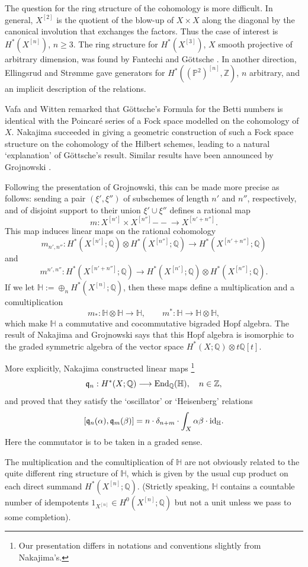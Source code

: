 \documentclass[twoside,11pt]{article}
\newcommand{\IH}{{\mathbb H}}
\newcommand{\IP}{{\mathbb P}}
\newcommand{\IQ}{{\mathbb Q}}
\newcommand{\IZ}{{\mathbb Z}}
\newcommand{\gothq}{{\mathfrak q}}
\newcommand{\tensor}{\otimes}
\newcommand{\End}{{\rm End}}
\newcommand{\qq}{\gothq}
\newcommand{\id}{{\rm id}}
\newcommand{\lra}{\longrightarrow}
\newcommand{\rationalmap}{{-{}-{}\!\to}}
\begin{document}
The question for the ring structure of the cohomology is more difficult. In general, $X^{[2]}$ is the quotient of the blow-up of $X\times X$ along the diagonal by the canonical involution that exchanges the factors. Thus the case
of interest is $H^*(X^{[n]})$, $n\geq3$. The ring structure for
$H^*(X^{[3]})$, $X$ smooth projective of arbitrary dimension, was found
by Fantechi and  G\"ottsche \cite{FantechiGoettsche}.
In another direction, Ellingsrud and Str\o{}mme \cite{EllStr2} gave generators 
for $H^*((\IP^2)^{[n]},\IZ)$, $n$ arbitrary, and an implicit description of the relations.

Vafa and  Witten \cite{VafaWitten} remarked that G\"ottsche's Formula for the 
Betti numbers is identical with the Poincar\'e series of a Fock space modelled 
on the cohomology of $X$. Nakajima \cite{Nakajima} succeeded in giving a 
geometric construction of such a Fock space structure on the cohomology of the 
Hilbert schemes, leading to a natural `explanation' of G\"ottsche's result. 
Similar results have been announced by Grojnowski \cite{Grojnowski}.

Following the presentation of  Grojnowski, this can be made more precise
as follows: sending a pair $(\xi',\xi'')$ of subschemes
of length $n'$ and $n''$, respectively, and of disjoint support to their
union $\xi'\cup\xi''$ defines a rational map 
$$m:X^{[n']}\times X^{[n'']}\rationalmap X^{[n'+n'']}.$$
This map induces linear maps on the rational cohomology
$$m_{n',n''}:H^*(X^{[n']};\IQ)\tensor H^*(X^{[n'']};\IQ)\lra H^*(X^{[n'+n'']};\IQ)$$
and
$$m^{n',n''}:H^*(X^{[n'+n'']};\IQ)\lra H^*(X^{[n']};\IQ)\tensor H^*(X^{[n'']};\IQ).$$
If we let $\IH:=\oplus_nH^*(X^{[n]};\IQ)$, then these maps define a multiplication
and a comultiplication
$$m_*:\IH\tensor\IH\lra \IH,\qquad m^*:\IH\lra \IH\tensor\IH,$$
which make $\IH$ a commutative and cocommutative bigraded Hopf algebra. The 
result of Nakajima and Grojnowski says that this Hopf algebra is isomorphic 
to the graded symmetric algebra of the vector space $H^*(X;\IQ)\tensor t\IQ[t]$. 

More explicitly, Nakajima constructed linear maps
\footnote{Our presentation differs in notations and conventions slightly from
Nakajima's.}
$$\qq_n:H^*(X;\IQ)\lra\End_\IQ(\IH),\quad n\in\IZ,$$
and proved that they satisfy the `oscillator' or `Heisenberg' relations
$$[\qq_n(\alpha),\qq_m(\beta)]= n\cdot 
\delta_{n+m}\cdot\int_X\alpha\beta\cdot\id_{\IH}.$$
Here the commutator is to be taken in a graded sense.

The multiplication and the comultiplication of $\IH$ are not obviously related
to the quite different ring structure of $\IH$, which is given by the usual
cup product on each direct summand $H^*(X^{[n]};\IQ)$. (Strictly speaking, $\IH$
contains a countable number of idempotents $1_{X^{[n]}}\in H^0(X^{[n]};\IQ)$ but
not a unit unless we pass to some completion).
\end{document}
